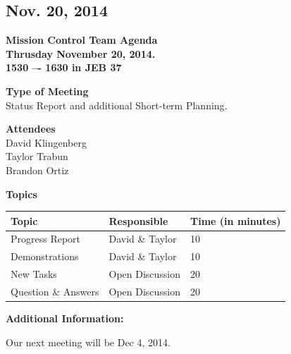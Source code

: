 \documentclass[pdftex,11pt]{article}
\begin{document}
\subsection{Nov. 20, 2014}
{ \huge \bfseries Mission Control Team Agenda \\[0.4cm] }
{ \huge \bfseries Thrusday November 20, 2014.\\1530 –-  1630  in JEB 37\\[0.4cm] }
\vspace*{2.5mm}

{ \large \bfseries \hspace*{2 mm} Type of Meeting\\}
\hspace*{12 mm}  Status Report and additional Short-term Planning.
\vspace*{1.5mm}

{ \large \bfseries \hspace*{2 mm} Attendees\\}
\hspace*{12mm} David Klingenberg\\
\hspace*{12mm} Taylor Trabun\\
\hspace*{12mm} Brandon Ortiz\\
\vspace*{1.5mm}

{ \large \bfseries \noindent Topics}
\vspace*{2.5mm}

\begin{tabular}{| l | l | l |}
  \hline
  \bfseries Topic & \bfseries Responsible & \bfseries Time (in minutes) \\ \hline
  Progress Report  & David \& Taylor &  10 \\ \hline
  Demonstrations & David \& Taylor & 10 \\ \hline
  New Tasks & Open Discussion & 20 \\ \hline
  Question \&  Answers  & Open Discussion & 20 \\ 
  \hline
\end{tabular}

\vspace*{2.5mm}
{ \large \bfseries \noindent Additional Information:}

Our next meeting will be Dec 4, 2014.
\end{document}

